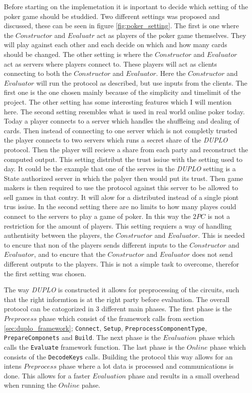 \documentclass[twoside,11pt,openright]{report}
\newcommand{\DUPLO}{\textit{DUPLO} }
\begin{document}
Before starting on the implemetation it is inportant to decide which setting of the poker game should be studdied. Two different settings was proposed and discussed, these can be seen in figure \ref{fig:poker_setting}. The first is one where the $Constructor$ and $Evaluatr$ act as players of the poker game themselves. They will play against each other and each decide on which and how many cards should be changed. The other setting is where the $Constructor$ and $Evaluator$ act as servers where players connect to. These players will act as clients connecting to both the $Constructor$ and $Evaluator$. Here the $Constructor$ and $Evaluator$ will run the protocol as described, but use inputs from the clients. The first one is the one chosen mainly because of the simplicity and timelimit of the project. The other setting has some interesting features which I will mention here. The second setting resembles what is used in real world online poker today. Today a player connects to a server which handles the shuffleing and dealing of cards. Then instead of connecting to one server which is not completly trusted the player connects to two servers which runs a secret share of the \DUPLO protocol. Then the player will recieve a share from each party and reconstruct the computed output. This setting distribut the trust issiue with the setting used to day. It could be the example that one of the serves in the \DUPLO setting is a State authorized server in which the palyer then would put its trust. Then game makers is then required to use the protocol against this server to be allowed to sell games in that contry. It will alow for a distributed instead of a single piont trus issiue. In the second setting there are no limits to how many playes could connect to the servers to play a game of poker. In this way the $2PC$ is not a restriction for the amount of players. This setting requiers a way of handling authentisity between the players, the $Constructor$ and $Evaluator$. This is needed to encure that non of the players sends different inputs to the $Constructor$ and $Evaluator$, and to encure that the $Constructor$ and $Evaluator$ does not send different outputs to the players. This is not a simple task to overcome, therefor the first setting was chosen.

The way \DUPLO is constructed it allows for preprocessing of the circuits, such that the right informtion is at the right party before evaluation. The overall protocol can be catogorized in 3 different main phases. The first phase is the $Preprocess$ phase which consist of the framework calls from section \ref{sec:duplo_framework}; \verb|Connect|, \verb|Setup|, \verb|PreprocessComponentType|, \verb|PrepareComponets| and \verb|Build|. The next phase is the $Evaluation$ phase which calls the \verb|Evaluate| framework function. The last phase is the $Online$ phase which consists of the \verb|DecodeKeys| calls. Building the protocol this way allows for an intens $Preprocess$ phase where a lot data is processed and communications is done. This allows for a faster $Evaluation$ phase and results in a small overhead when running the $Online$ pahse.
\end{document}
